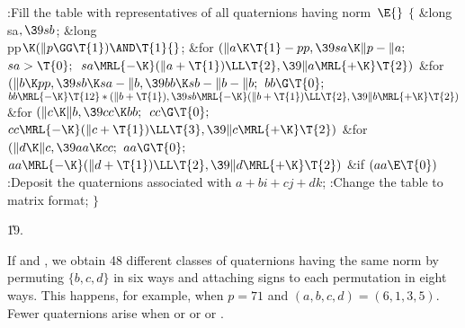 \Y\B\4:Fill the  table with representatives of all quaternions
having norm~\X${}\E{}$\6
${}\{{}$\5
\1\&{long} \\{sa}${},\39\\{sb}{}$;\6
\&{long} \\{pp}${}\K(\|p\GG\T{1})\AND\T{1}{}$;\7
\&{for} ${}(\|a\K\T{1}-\\{pp},\39\\{sa}\K\|p-\|a;{}$ ${}\\{sa}>\T{0};{}$ ${}%
\\{sa}\MRL{-{\K}}(\|a+\T{1})\LL\T{2},\39\|a\MRL{+{\K}}\T{2}){}$\1\6
\&{for} ${}(\|b\K\\{pp},\39\\{sb}\K\\{sa}-\|b,\39\\{bb}\K\\{sb}-\|b-\|b;{}$ ${}%
\\{bb}\G\T{0};{}$ ${}\\{bb}\MRL{-{\K}}\T{12}*(\|b+\T{1}),\39\\{sb}\MRL{-{\K}}(%
\|b+\T{1})\LL\T{2},\39\|b\MRL{+{\K}}\T{2}){}$\1\6
\&{for} ${}(\|c\K\|b,\39\\{cc}\K\\{bb};{}$ ${}\\{cc}\G\T{0};{}$ ${}\\{cc}%
\MRL{-{\K}}(\|c+\T{1})\LL\T{3},\39\|c\MRL{+{\K}}\T{2}){}$\1\6
\&{for} ${}(\|d\K\|c,\39\\{aa}\K\\{cc};{}$ ${}\\{aa}\G\T{0};{}$ ${}\\{aa}%
\MRL{-{\K}}(\|d+\T{1})\LL\T{2},\39\|d\MRL{+{\K}}\T{2}){}$\1\6
\&{if} ${}(\\{aa}\E\T{0}){}$\1\5
:Deposit the quaternions associated with $a+bi+cj+dk$\X;\2\2\2\2\2\6
:Change the  table to matrix format\X;\6
\4${}\}{}$\2\par
\U19.\fi

If  and , we obtain 48 different
classes of quaternions
having the same norm by permuting $\{b,c,d\}$ in six ways and attaching
signs to each permutation in eight ways. This happens, for example,
when $p=71$ and $(a,b,c,d)=(6,1,3,5)$. Fewer quaternions arise when
 or  or  or .


